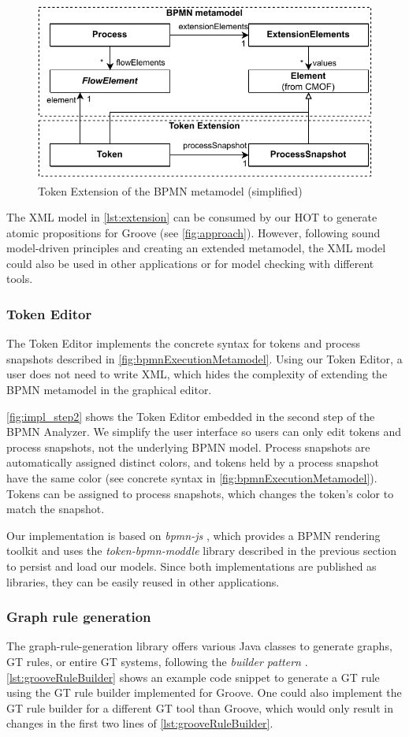 \documentclass{lmcs} %
\begin{document}
\begin{figure}[ht]
    \centering
    \includegraphics[width=.6\textwidth]{images/bpmn_extension.pdf}
    \caption{Token Extension of the BPMN metamodel (simplified)}
    \label{fig:token_extension}
\end{figure}

The XML model in \autoref{lst:extension} can be consumed by our HOT to generate atomic propositions for Groove (see \autoref{fig:approach}).
However, following sound model-driven principles and creating an extended metamodel, the XML model could also be used in other applications or for model checking with different tools.

\subsubsection{Token Editor}
The Token Editor implements the concrete syntax for tokens and process snapshots described in \autoref{fig:bpmnExecutionMetamodel}.
Using our Token Editor, a user does not need to write XML, which hides the complexity of extending the BPMN metamodel in the graphical editor.

\autoref{fig:impl_step2} shows the Token Editor embedded in the second step of the BPMN Analyzer.
We simplify the user interface so users can only edit tokens and process snapshots, not the underlying BPMN model.
Process snapshots are automatically assigned distinct colors, and tokens held by a process snapshot have the same color (see concrete syntax in \autoref{fig:bpmnExecutionMetamodel}).
Tokens can be assigned to process snapshots, which changes the token's color to match the snapshot.

Our implementation is based on \textit{bpmn-js} \cite{camundaservicesgmbhBpmnjs2023}, which provides a BPMN rendering toolkit and uses the \textit{token-bpmn-moddle} library described in the previous section to persist and load our models.
Since both implementations are published as libraries, they can be easily reused in other applications.

\subsubsection{Graph rule generation}
The graph-rule-generation library offers various Java classes to generate graphs, GT rules, or entire GT systems, following the \textit{builder pattern} \cite{gammaDesignPatternsElements1995}.
\autoref{lst:grooveRuleBuilder} shows an example code snippet to generate a GT rule using the GT rule builder implemented for Groove.
One could also implement the GT rule builder for a different GT tool than Groove, which would only result in changes in the first two lines of \autoref{lst:grooveRuleBuilder}.
\end{document}
